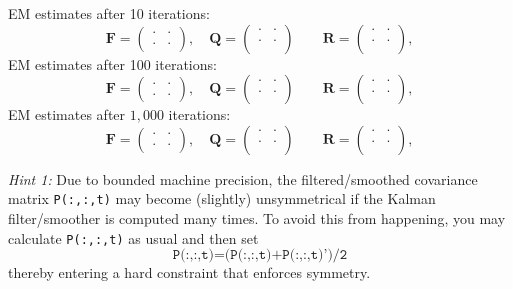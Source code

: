 \documentclass[12pt, a4paper]{article}
\newcommand{\FF}{\mathbf{F}}
\newcommand{\QQ}{\mathbf{Q}}
\newcommand{\RR}{\mathbf{R}}
\begin{document}
\bigskip
\noindent EM estimates after 10 iterations:
\[
\FF=\left(
\begin{array}{cc}
\cdot & \cdot \\
\cdot & \cdot
\end{array}
\right),\quad
\QQ=\left(
\begin{array}{cc}
\cdot & \cdot \\
\cdot & \cdot \\
\end{array}
\right)\quad
\quad
\RR=\left(
\begin{array}{cc}
\cdot & \cdot \\
\cdot & \cdot \\
\end{array}
\right),
\]
EM estimates after 100 iterations:
\[
\FF=\left(
\begin{array}{cc}
\cdot & \cdot \\
\cdot & \cdot
\end{array}
\right),\quad
\QQ=\left(
\begin{array}{cc}
\cdot & \cdot \\
\cdot & \cdot \\
\end{array}
\right)\quad
\quad
\RR=\left(
\begin{array}{cc}
\cdot & \cdot \\
\cdot & \cdot \\
\end{array}
\right),
\]
EM estimates after $1,000$ iterations:
\[
\FF=\left(
\begin{array}{cc}
\cdot & \cdot \\
\cdot & \cdot
\end{array}
\right),\quad
\QQ=\left(
\begin{array}{cc}
\cdot & \cdot \\
\cdot & \cdot \\
\end{array}
\right)\quad
\quad
\RR=\left(
\begin{array}{cc}
\cdot & \cdot \\
\cdot & \cdot \\
\end{array}
\right),
\]



\medskip

\noindent \emph{Hint 1:} Due to bounded machine precision, the filtered/smoothed covariance matrix \texttt{P(:,:,t)} may become (slightly) unsymmetrical if the Kalman filter/smoother is computed many times. To avoid this from happening, you may calculate \texttt{P(:,:,t)} as usual and then set 
$$
\texttt{P(:,:,t)=(P(:,:,t)+P(:,:,t)')/2} 
$$
thereby entering a hard constraint that enforces symmetry. 
\end{document}

